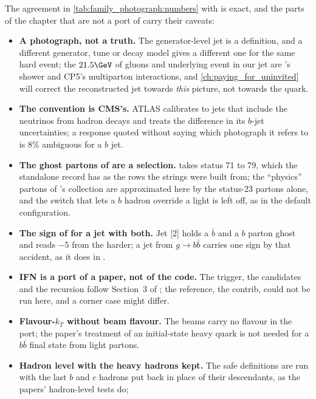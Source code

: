 The agreement in \cref{tab:family_photograph:numbers} with \FASTJET is
exact, and the parts of the chapter that are not a port of \FASTJET
carry their caveats:
\begin{itemize}
  \item \textbf{A photograph, not a truth.} The generator-level jet is
    a definition, and a different generator, tune or decay model gives a
    different one for the same hard event; the $21.5\GeV$ of gluons and
    underlying event in our jet are \PYTHIA's shower and CP5's
    multiparton interactions, and \cref{ch:paying_for_uninvited} will
    correct the reconstructed jet towards \emph{this} picture, not
    towards the quark.
  \item \textbf{The \akfournonu convention is CMS's.} ATLAS calibrates
    to jets that include the neutrinos from hadron decays and treats the
    difference in its $b$-jet uncertainties; a response quoted without
    saying which photograph it refers to is $8\%$ ambiguous for a $b$
    jet.
  \item \textbf{The ghost partons of \CMSSW are a selection.}
     takes status 71 to 79, which the
    standalone record has as the rows the strings were built from; the
    ``physics'' partons of \CMSSW's  collection are
    approximated here by the status-23 partons alone, and the
     switch that lets a $b$ hadron
    override a light \partflav is left off, as in the default
    configuration.
  \item \textbf{The sign of \partflav for a jet with both.} Jet [2] holds
    a $\bar b$ and a $b$ parton ghost and reads $-5$ from the harder; a
    jet from $g\to b\bar b$ carries one sign by that accident, as it does
    in \CMSSW.
  \item \textbf{IFN is a port of a paper, not of the code.} The
    trigger, the candidates and the recursion follow Section~3 of
    \cite{Caletti:2022glq}; the reference, the \FASTJET contrib, could
    not be run here, and a corner case might differ.
  \item \textbf{Flavour-$k_T$ without beam flavour.} The beams carry no
    flavour in the port; the paper's treatment of an initial-state
    heavy quark is not needed for a $b\bar b$ final state from light
    partons.
  \item \textbf{Hadron level with the heavy hadrons kept.} The safe
    definitions are run with the last $b$ and $c$ hadrons put back in
    place of their descendants, as the papers' hadron-level tests do;

\end{itemize}
